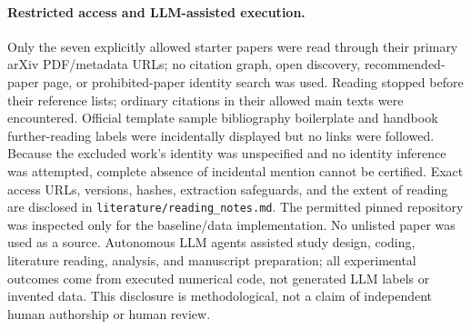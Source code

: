 \paragraph{Restricted access and LLM-assisted execution.}
Only the seven explicitly allowed starter papers were read through their primary arXiv PDF/metadata URLs; no citation graph, open discovery, recommended-paper page, or prohibited-paper identity search was used. Reading stopped before their reference lists; ordinary citations in their allowed main texts were encountered. Official template sample bibliography boilerplate and handbook further-reading labels were incidentally displayed but no links were followed. Because the excluded work's identity was unspecified and no identity inference was attempted, complete absence of incidental mention cannot be certified. Exact access URLs, versions, hashes, extraction safeguards, and the extent of reading are disclosed in \texttt{literature/reading\_notes.md}. The permitted pinned repository was inspected only for the baseline/data implementation. No unlisted paper was used as a source. Autonomous LLM agents assisted study design, coding, literature reading, analysis, and manuscript preparation; all experimental outcomes come from executed numerical code, not generated LLM labels or invented data. This disclosure is methodological, not a claim of independent human authorship or human review.
